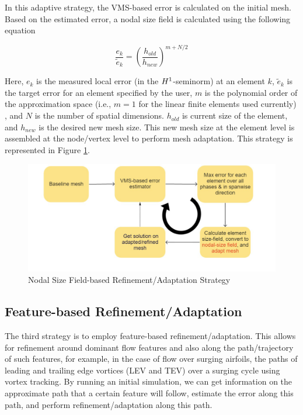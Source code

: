 In this adaptive strategy, the VMS-based error is calculated on the initial mesh. Based on the estimated error, a nodal size field is calculated using the following equation \cite{zhang19}

\begin{equation}
	\frac{e_k}{\tilde{e}_k} = \left(\frac{h_{old}}{h_{new}}\right)^{m+N/2} 
	\label{eq:diez}
\end{equation}

Here, $e_k$ is the measured local error (in the $H^{1}$-seminorm) at an element $k$, $\tilde{e}_k$ is the target error for an element specified by the user, $m$ is the polynomial order of the approximation space (i.e., $m=1$ for the linear finite elements used currently) , and $N$ is the number of spatial dimensions. $h_{old}$ is current size of the element, and $h_{new}$ is the desired new mesh size.
This new mesh size at the element level is assembled at the node/vertex level to perform mesh adaptation.
This strategy is represented in Figure \ref{fig:size_based_strat}.

\begin{figure}[H]
	\centering
	\includegraphics[width=1\textwidth]{figures/adapt_strat/size_based.png}
	\caption{Nodal Size Field-based Refinement/Adaptation Strategy}
	\label{fig:size_based_strat}
\end{figure}

\subsection{Feature-based Refinement/Adaptation}

The third strategy is to employ feature-based refinement/adaptation. This allows for refinement around dominant flow features and also along the path/trajectory of such features, for example, in the case of flow over surging airfoils, the paths of leading and trailing edge vortices (LEV and TEV) over a surging cycle using vortex tracking. By running an initial simulation, we can get information on the approximate path that a certain feature will follow, estimate the error along this path, and perform refinement/adaptation along this path.

